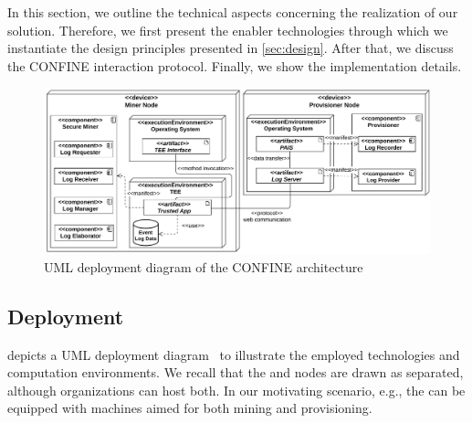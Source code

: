 In this section, we outline the technical aspects concerning the realization of our solution. Therefore, we first present the enabler technologies through which we instantiate the design principles presented in \cref{sec:design}. After that, we discuss the CONFINE interaction protocol. Finally, we show the implementation details.

%
\begin{figure}[t]
	\centering
	\includegraphics[width=1\linewidth]{content/figures/deploymentdiagram.pdf}
	\caption{UML deployment diagram of the CONFINE architecture}
	\label{fig:deployment_diagram}
\end{figure}
%
\subsection{Deployment}
\label{sec:deployment}
%
 depicts a UML deployment diagram~\citep{koch2002expressive} to illustrate the employed technologies and computation environments. %
We recall that the  and  nodes are drawn as separated, although organizations can host both.
In our motivating scenario, e.g., the  can be equipped with machines aimed for both mining and provisioning. %

